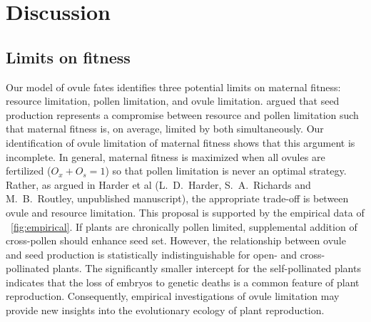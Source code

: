 \documentclass[letterpaper,titlepage]{scrartcl}
\newcommand{\OFMixedMating}{L.~D.~Harder, S.~A.~Richards and
  M.~B.~Routley, unpublished manuscript}
\begin{document}
\section{Discussion}

\subsection{Limits on fitness}
Our model of ovule fates identifies three potential limits on maternal
fitness: resource limitation, pollen limitation, and ovule
limitation. \citet{Haig88} argued that seed production represents a
compromise between resource and pollen limitation such that maternal
fitness is, on average, limited by both simultaneously. Our
identification of ovule limitation of maternal fitness shows that this
argument is incomplete. In general, maternal fitness is maximized when
all ovules are fertilized ($O_{x}+O_{s}=1$) so that pollen limitation
is never an optimal strategy. Rather, as argued in Harder et al
({\OFMixedMating}), the appropriate trade-off is between ovule and
resource limitation. This proposal is supported by the empirical data
of {\fref}~\ref{fig:empirical}. If plants are chronically pollen
limited, supplemental addition of cross-pollen should enhance seed
set. However, the relationship between ovule and seed production is
statistically indistinguishable for open- and cross-pollinated
plants. The significantly smaller intercept for the self-pollinated plants
indicates that the loss of embryos to genetic deaths is a common
feature of plant reproduction. Consequently, empirical investigations
of ovule limitation may provide new insights into the evolutionary
ecology of plant reproduction.
\end{document}

